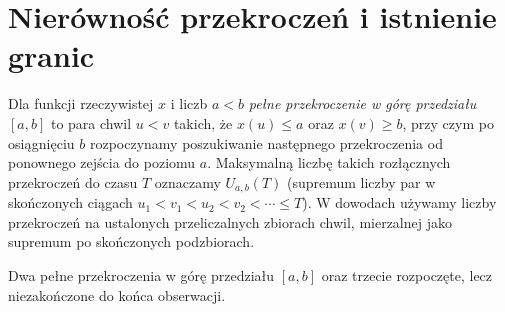 \section{Nierówność przekroczeń i istnienie granic}
\begin{definicja}
Dla funkcji rzeczywistej $x$ i liczb $a<b$ \emph{
pełne przekroczenie w górę przedziału $[a,b]$} to
para chwil $u<v$ takich, że $x(u)\le a$
oraz $x(v)\ge b$, przy czym po osiągnięciu $b$
rozpoczynamy poszukiwanie następnego przekroczenia
od ponownego zejścia do poziomu $a$. Maksymalną liczbę
takich rozłącznych przekroczeń do czasu $T$ oznaczamy
$U_{a,b}(T)$ (supremum liczby par w skończonych
ciągach $u_1<v_1<u_2<v_2<\cdots\le T$).
W dowodach używamy liczby przekroczeń na ustalonych
przeliczalnych zbiorach chwil, mierzalnej jako
supremum po skończonych podzbiorach.
\end{definicja}

\begin{center}
\par\smallskip\small Dwa pełne przekroczenia w górę
przedziału $[a,b]$ oraz trzecie rozpoczęte,
lecz niezakończone do końca obserwacji.
\end{center}

